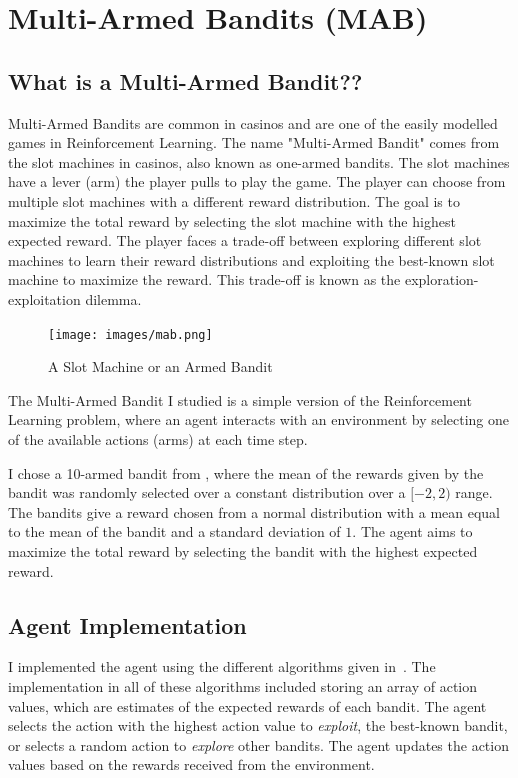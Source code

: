 \section{Multi-Armed Bandits (MAB)}

\subsection{What is a Multi-Armed Bandit??}

Multi-Armed Bandits are common in casinos and are one of the easily modelled games in Reinforcement Learning. The name "Multi-Armed Bandit" comes from the slot machines in casinos, also known as one-armed bandits. The slot machines have a lever (arm) the player pulls to play the game. The player can choose from multiple slot machines with a different reward distribution. The goal is to maximize the total reward by selecting the slot machine with the highest expected reward. The player faces a trade-off between exploring different slot machines to learn their reward distributions and exploiting the best-known slot machine to maximize the reward. This trade-off is known as the exploration-exploitation dilemma.

\begin{figure}[h]
    \centering
    \texttt{[image: images/mab.png]}
    \caption{A Slot Machine or an Armed Bandit}
    \label{fig:mab}
\end{figure}

The Multi-Armed Bandit I studied is a simple version of the Reinforcement Learning problem, where an agent interacts with an environment by selecting one of the available actions (arms) at each time step.

I chose a 10-armed bandit from \cite{sutton2018reinforcement}, where the mean of the rewards given by the bandit was randomly selected over a constant distribution over a $[-2,2)$ range. The bandits give a reward chosen from a normal distribution with a mean equal to the mean of the bandit and a standard deviation of $1$. The agent aims to maximize the total reward by selecting the bandit with the highest expected reward.

\subsection{Agent Implementation}

I implemented the agent using the different algorithms given in~\cite{sutton2018reinforcement}. The implementation in all of these algorithms included storing an array of action values, which are estimates of the expected rewards of each bandit. The agent selects the action with the highest action value to \textit{exploit}, the best-known bandit, or selects a random action to \textit{explore} other bandits. The agent updates the action values based on the rewards received from the environment.


